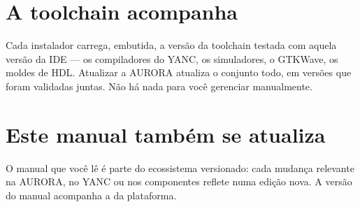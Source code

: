\section{A toolchain acompanha}

Cada instalador carrega, embutida, a versão da toolchain testada com aquela versão da IDE --- os compiladores do YANC, os simuladores, o GTKWave, os moldes de HDL. Atualizar a AURORA atualiza o conjunto todo, em versões que foram validadas juntas. Não há nada para você gerenciar manualmente.

\section{Este manual também se atualiza}

O manual que você lê é parte do ecossistema versionado: cada mudança relevante na AURORA, no YANC ou nos componentes reflete numa edição nova. A versão do manual acompanha a da plataforma.
